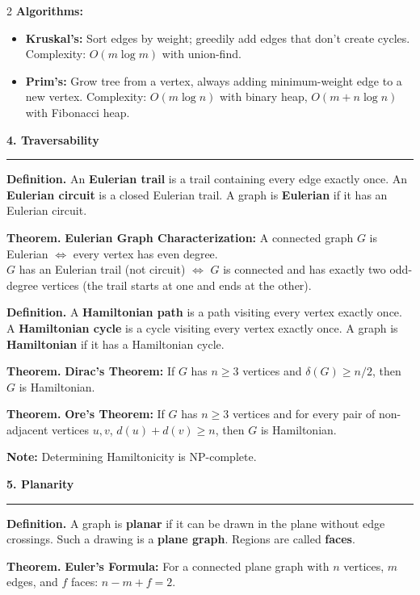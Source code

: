 \documentclass[8pt,landscape,a4paper]{extarticle}
\newcommand{\thm}[1]{\begin{mdframed}[style=theorembox]\textbf{Theorem.} #1\end{mdframed}}
\newcommand{\defn}[1]{\begin{mdframed}[style=defbox]\textbf{Definition.} #1\end{mdframed}}
\newcommand{\heading}[1]{\vspace{1pt}\noindent\textbf{\large #1}\vspace{1pt}\hrule\vspace{2pt}}
\begin{document}
\begin{multicols}{2}
\textbf{Algorithms:}
\begin{itemize}[nosep]
    \item \textbf{Kruskal's:} Sort edges by weight; greedily add edges that don't create cycles. Complexity: $O(m \log m)$ with union-find.
    \item \textbf{Prim's:} Grow tree from a vertex, always adding minimum-weight edge to a new vertex. Complexity: $O(m \log n)$ with binary heap, $O(m + n \log n)$ with Fibonacci heap.
\end{itemize}

\heading{4. Traversability}

\defn{An \textbf{Eulerian trail} is a trail containing every edge exactly once. An \textbf{Eulerian circuit} is a closed Eulerian trail. A graph is \textbf{Eulerian} if it has an Eulerian circuit.}

\thm{\textbf{Eulerian Graph Characterization:} A connected graph $G$ is Eulerian $\iff$ every vertex has even degree.\\
$G$ has an Eulerian trail (not circuit) $\iff$ $G$ is connected and has exactly two odd-degree vertices (the trail starts at one and ends at the other).}

\defn{A \textbf{Hamiltonian path} is a path visiting every vertex exactly once. A \textbf{Hamiltonian cycle} is a cycle visiting every vertex exactly once. A graph is \textbf{Hamiltonian} if it has a Hamiltonian cycle.}

\thm{\textbf{Dirac's Theorem:} If $G$ has $n \geq 3$ vertices and $\delta(G) \geq n/2$, then $G$ is Hamiltonian.}

\thm{\textbf{Ore's Theorem:} If $G$ has $n \geq 3$ vertices and for every pair of non-adjacent vertices $u,v$, $d(u) + d(v) \geq n$, then $G$ is Hamiltonian.}

\textbf{Note:} Determining Hamiltonicity is NP-complete.

\heading{5. Planarity}

\defn{A graph is \textbf{planar} if it can be drawn in the plane without edge crossings. Such a drawing is a \textbf{plane graph}. Regions are called \textbf{faces}.}

\thm{\textbf{Euler's Formula:} For a connected plane graph with $n$ vertices, $m$ edges, and $f$ faces: $n - m + f = 2$.}


\end{multicols}
\end{document}
